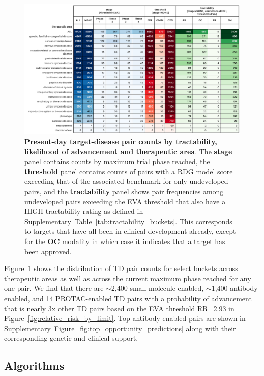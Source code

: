 \documentclass{article}
\begin{document}
\begin{figure}[!htb]
  \centering
  \captionsetup{width=.9\linewidth}
  \includegraphics[width=1\textwidth]{opportunity_summary.png}
  \caption{
    \textbf{Present-day target-disease pair counts by tractability, likelihood of advancement and therapeutic area}. The \textbf{stage} panel contains counts by maximum trial phase reached, the \textbf{threshold} panel contains counts of pairs with a RDG model score exceeding that of the associated benchmark for only undeveloped pairs, and the \textbf{tractability} panel shows pair frequencies among undeveloped pairs exceeding the EVA threshold that also have a HIGH tractability rating as defined in Supplementary~Table~\ref{tab:tractability_buckets}. This corresponds to targets that have all been in clinical development already, except for the \textbf{OC} modality in which case it indicates that a target has been approved. 
  }
  \label{fig:opportunity_summary}
\end{figure}

Figure~\ref{fig:opportunity_summary} shows the distribution of TD pair counts for select buckets across therapeutic areas as well as across the current maximum phase reached for any one pair. We find that there are $\sim$2,400 small-molecule-enabled, $\sim$1,400 antibody-enabled, and 14 PROTAC-enabled TD pairs with a probability of advancement that is nearly 3x other TD pairs based on the EVA threshold RR=2.93 in Figure~\ref{fig:relative_risk_by_limit}. Top antibody-enabled pairs are shown in Supplementary~Figure~\ref{fig:top_opportunity_predictions} along with their corresponding genetic and clinical support.

\subsection{Algorithms}
\end{document}
